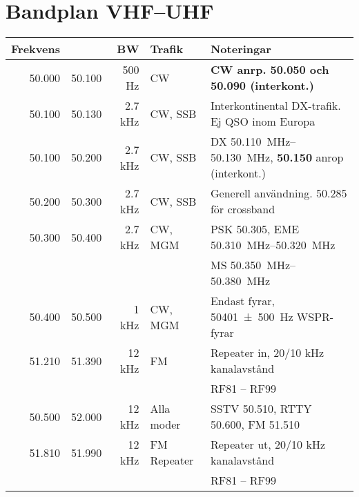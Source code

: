 \section{Bandplan VHF--UHF}

\begin{tabular}{rrrll}
\textbf{Frekvens} &        & \textbf{BW} & \textbf{Trafik}
& \textbf{Noteringar} \\ \hline

50.000 & 50.100 & 500 Hz  & CW          & \textbf{CW anrp. 50.050 och 50.090 (interkont.)}                                    \\ \hline
50.100 & 50.130 & 2.7 kHz & CW, SSB     & Interkontinental DX-trafik. Ej QSO inom Europa                                      \\ \hline
50.100 & 50.200 & 2.7 kHz & CW, SSB      &
DX \SIrange{50,110}{50,130}{\mega\hertz}, \textbf{\num{50,150}} anrop (interkont.)  \\ \hline
50.200 & 50.300 & 2.7 kHz & CW, SSB      & Generell användning. \num{50,285} för crossband                                     \\ \hline
50.300 & 50.400 & 2.7 kHz & CW, MGM     & PSK \num{50,305}, EME \SIrange{50,310}{50,320}{\mega\hertz}                         \\
       &        &         &             & MS \SIrange{50,350}{50,380}{\mega\hertz}                                            \\ \hline
50.400 & 50.500 & 1 kHz   & CW, MGM     & Endast fyrar, \SI{50401(500)}{\hertz} WSPR-fyrar                                        \\ \hline
51.210 & 51.390 & 12 kHz  & FM          & Repeater in, 20/10 kHz kanalavstånd                                                 \\
       &        &         &             & RF81 – RF99                                                                         \\ \hline
50.500 & 52.000 & 12 kHz  & Alla moder  & SSTV \num{50,510}, RTTY \num{50,600}, FM \num{51,510}                               \\ \hline
51.810 & 51.990 & 12 kHz  & FM Repeater & Repeater ut, 20/10 kHz kanalavstånd                                                 \\
       &        &         &             & RF81 – RF99                                                                         \\ \hline
\end{tabular}

